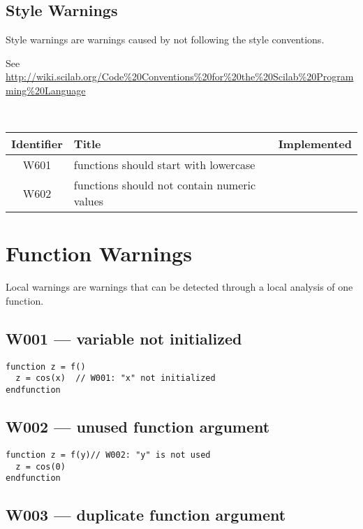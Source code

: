 \subsection{Style Warnings}



Style warnings are warnings caused by not following the style conventions.



See \url{http://wiki.scilab.org/Code%20Conventions%20for%20the%20Scilab%20Programming%20Language}



\noindent\\\begin{tabular}{|c|p{8cm}|c|} \hline
Identifier & Title & Implemented      \\ \hline
W601 & functions should start with lowercase &  \\ \hline
W602 & functions should not contain numeric values &  \\ \hline
\end{tabular}

\section{Function Warnings}



Local warnings are warnings that can be detected through a local analysis of
one function.



\subsection{W001 --- variable not initialized}


\begin{verbatim}
function z = f()
  z = cos(x)  // W001: "x" not initialized
endfunction
\end{verbatim}


\subsection{W002 --- unused function argument}


\begin{verbatim}
function z = f(y)// W002: "y" is not used
  z = cos(0)
endfunction
\end{verbatim}


\subsection{W003 --- duplicate function argument}




